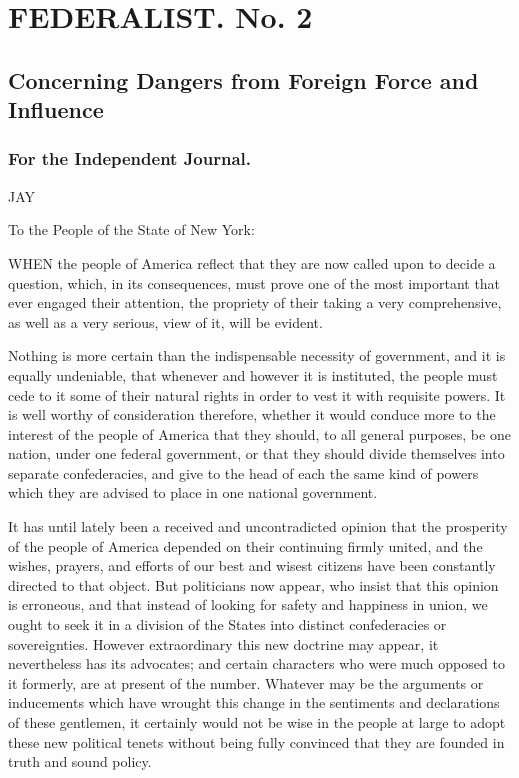 \chapter*{FEDERALIST. No. 2} %


\section*{Concerning Dangers from Foreign Force and Influence}

\subsection*{For the Independent Journal.}

JAY



To the People of the State of New York:

WHEN the people of America reflect that they are now called upon
to decide a question, which, in its consequences, must prove one of
the most important that ever engaged their attention, the propriety
of their taking a very comprehensive, as well as a very serious,
view of it, will be evident.

Nothing is more certain than the indispensable necessity of
government, and it is equally undeniable, that whenever and however
it is instituted, the people must cede to it some of their natural
rights in order to vest it with requisite powers. It is well worthy
of consideration therefore, whether it would conduce more to the
interest of the people of America that they should, to all general
purposes, be one nation, under one federal government, or that they
should divide themselves into separate confederacies, and give to
the head of each the same kind of powers which they are advised to
place in one national government.

It has until lately been a received and uncontradicted opinion
that the prosperity of the people of America depended on their
continuing firmly united, and the wishes, prayers, and efforts of
our best and wisest citizens have been constantly directed to that
object. But politicians now appear, who insist that this opinion is
erroneous, and that instead of looking for safety and happiness in
union, we ought to seek it in a division of the States into distinct
confederacies or sovereignties. However extraordinary this new
doctrine may appear, it nevertheless has its advocates; and certain
characters who were much opposed to it formerly, are at present of
the number. Whatever may be the arguments or inducements which have
wrought this change in the sentiments and declarations of these
gentlemen, it certainly would not be wise in the people at large to
adopt these new political tenets without being fully convinced that
they are founded in truth and sound policy.

